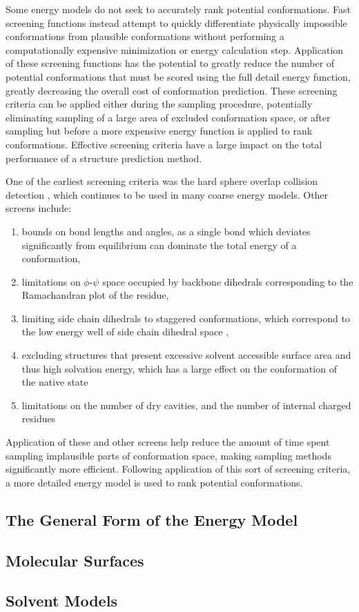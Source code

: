 Some energy models do not seek to accurately rank potential conformations.
Fast screening functions instead attempt to quickly differentiate physically impossible conformations from plausible conformations without performing a computationally expensive minimization or energy calculation step.
Application of these screening functions has the potential to greatly reduce the number of potential conformations that must be scored using the full detail energy function, greatly decreasing the overall cost of conformation prediction.
These screening criteria can be applied either during the sampling procedure, potentially eliminating sampling of a large area of excluded conformation space, or after sampling but before a more expensive energy function is applied to rank conformations.
Effective screening criteria have a large impact on the total performance of a structure prediction method.

One of the earliest screening criteria was the hard sphere overlap collision detection \cite{levinthal1966molecular}, which continues to be used in many coarse energy models.
Other screens include:
\begin{enumerate}
\item bounds on bond lengths and angles, as a single bond which deviates significantly from equilibrium can dominate the total energy of a conformation,
\item limitations on $\phi$-$\psi$ space occupied by backbone dihedrals corresponding to the Ramachandran plot of the residue,
\item limiting side chain dihedrals to staggered conformations, which correspond to the low energy well of side chain dihedral space \cite{moult1986algorithm},
\item excluding structures that present excessive solvent accessible surface area and thus high solvation energy, which has a large effect on the conformation of the native state \cite{chothia1975principles}
\item limitations on the number of dry cavities, and the number of internal charged residues \cite{moult1986algorithm}
\end{enumerate}
Application of these and other screens help reduce the amount of time spent sampling implausible parts of conformation space, making sampling methods significantly more efficient.
Following application of this sort of screening criteria, a more detailed energy model is used to rank potential conformations.

\subsection{The General Form of the Energy Model}
\label{subsection:energy_general_form}


\subsection{Molecular Surfaces}
\label{subsection:molecular_surfaces}


\subsection{Solvent Models}
\label{subsection:Solvent Models}

